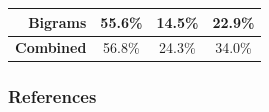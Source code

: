 \documentclass[table]{beamer}
\begin{document}
\begin{frame}
\begin{tabular}{r|c|c|c|}
\\
  \hline
  \textbf{Bigrams} & 55.6\% & 14.5\% & 22.9\% \\
  \hline
  \textbf{Combined} & 56.8\% & 24.3\% & 34.0\% \\
  \hline
  \end{tabular}
\end{frame}

\begin{frame}
  \frametitle{References}
  
  
\end{frame}
\end{document}
